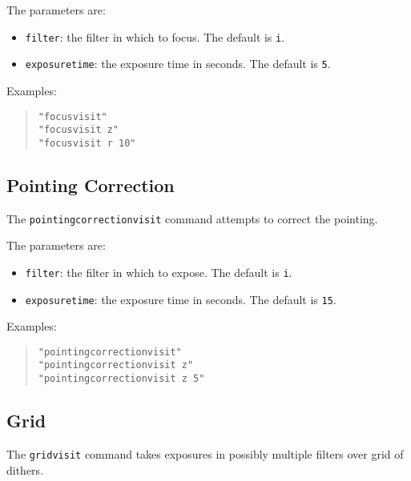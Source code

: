 The parameters are:
\begin{itemize}
    \item \verb|filter|: the filter in which to focus. The default is \verb|i|.
    \item \verb|exposuretime|: the exposure time in seconds. The default is \verb|5|.
\end{itemize}

Examples:
\begin{quote}
\begin{verbatim}
"focusvisit"
"focusvisit z"
"focusvisit r 10"
\end{verbatim}
\end{quote}

\subsection{Pointing Correction}

The \verb|pointingcorrectionvisit| command attempts to correct the pointing. 

The parameters are:
\begin{itemize}
    \item \verb|filter|: the filter in which to expose. The default is \verb|i|.
    \item \verb|exposuretime|: the exposure time in seconds. The default is \verb|15|.
\end{itemize}

Examples:
\begin{quote}
\begin{verbatim}
"pointingcorrectionvisit"
"pointingcorrectionvisit z"
"pointingcorrectionvisit z 5"
\end{verbatim}
\end{quote}

\subsection{Grid}

The \verb|gridvisit| command takes exposures in possibly multiple filters over grid of dithers.

